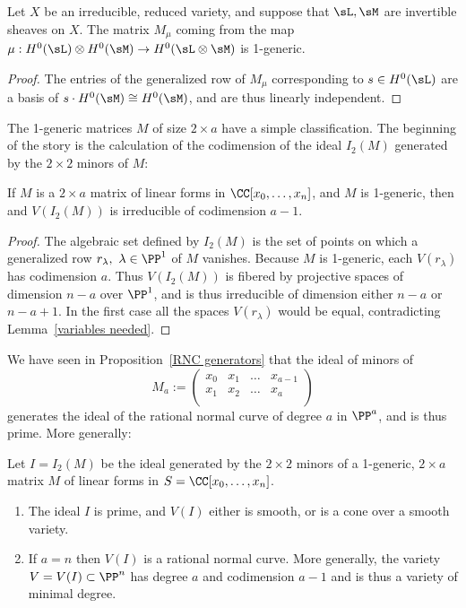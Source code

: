 \begin{proposition}\label{some generators}
Let $X$ be
an irreducible, reduced variety, and suppose that $\sL,\sM$ are invertible sheaves on $X$.
The matrix $M_\mu$ coming from the map $\mu:H^0(\sL) \otimes H^0(\sM) \to H^0(\sL\otimes \sM)$
is 1-generic.
\end{proposition}

\begin{proof} The entries of the generalized row of $M_\mu$ corresponding to $s\in H^0(\sL)$
are a basis of $s\cdot H^0(\sM) \cong H^0(\sM)$, and are thus
linearly independent.
\end{proof}

The 1-generic matrices $M$ of size $2\times a$ have a simple classification. The beginning of the story is the
 calculation of the codimension of the ideal $I_2(M)$ generated by the $2\times 2$ minors of $M$:

\begin{lemma}\label{codim of 2,n 1-generic}
If $M$ is a $2\times a$ matrix of linear forms in $\CC[x_0,\dots, x_n]$, and $M$ is 1-generic, then 
and  $V(I_2(M))$ is irreducible of codimension $a-1$.
\end{lemma}

\begin{proof}
The algebraic set defined by $I_2(M)$ is the set of points on which a generalized row $r_\lambda, \ \lambda\in \PP^1$ of $M$ vanishes.
Because $M$ is 1-generic, each $V(r_\lambda)$ has codimension $a$. Thus $V(I_2(M))$ is fibered by projective
spaces of dimension $n-a$ over $\PP^1$, and is thus irreducible of dimension either $n-a$ or $n-a+1$. In the first
case all the spaces $V(r_\lambda)$  would be equal, contradicting Lemma~\ref{variables needed}.
\end{proof}


We have seen in Proposition~\ref{RNC generators} that the ideal of minors of
$$
M_{a}:= 
\begin{pmatrix}
 x_0&x_1&\dots&x_{a-1}\\
 x_1&x_2&\dots&x_{a}\\
\end{pmatrix}
$$ 
generates the ideal of the rational normal curve of degree $a$ in $\PP^a$, and is thus prime. More generally:

\begin{theorem}\label{1-generic basics}  
Let $I = I_2(M)$  be the ideal generated by the $2\times 2$ minors of  a 1-generic, $2\times a$ matrix $M$
of linear forms in $S = \CC[x_0,\dots, x_n]$.
 \begin{enumerate}

\item The ideal $I$ is prime, and $V(I)$ either is smooth, or is a cone over a smooth variety.

\item If $a=n$ then $V(I)$ is a rational normal curve. More generally, the variety $V = V(I) \subset \PP^n$ has degree $a$ and codimension $a-1$ and is thus a variety of minimal degree.
\end{enumerate}
\end{theorem}

